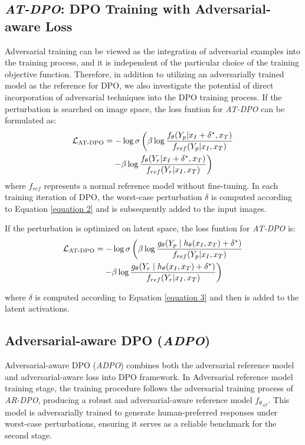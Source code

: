 \vspace{-0.5em}
\subsection{\textit{AT-DPO}: DPO Training with Adversarial-aware Loss}
\vspace{-0.5em}
\label{AT-DPO}
Adversarial training can be viewed as the integration of adversarial examples into the training process, and it is independent of the particular choice of the training objective function. Therefore, in addition to utilizing an adversarially trained model as the reference for DPO, we also investigate the potential of direct incorporation of adversarial techniques into the DPO training process. If the perturbation is searched on image space, the loss funtion for \textit{AT-DPO} can be formulated as:
\vspace{-0.5em}
{\fontsize{10}{12}
\begin{align}
\mathcal{L}_{\text{AT-}\text{DPO}} &= -\log \sigma \left( \beta \log \frac{f_{\theta}(Y_{p} | x_I+\delta^* , x_T)}{f_{ref}(Y_{p} | x_I, x_T)} \right. \notag \\
&\quad \left. - \beta \log \frac{f_{\theta}(Y_{r} | x_I+\delta^* , x_T)}{f_{ref}(Y_{r} | x_I, x_T)} \right)
\end{align}
}
where $f_{ref}$ represents a normal reference model without fine-tuning. In each training iteration of DPO, the worst-case perturbation $\delta$ is computed according to Equation \ref{equation 2} and is subsequently added to the input images. 

If the perturbation is optimized on latent space, the loss funtion for \textit{AT-DPO} is:
\vspace{-0.5em}
{\fontsize{10}{12}
\begin{align} 
\mathcal{L}_{\text{AT-}\text{DPO}} &= -\log \sigma \left( \beta \log \frac{g_\theta(Y_{p} \mid h_{\theta}(x_I, x_T)+ \delta^* )}{f_{ref}(Y_{p} | x_I, x_T)} \right. \notag \\
 &\quad \left. - \beta \log \frac{g_\theta(Y_{r} \mid h_{\theta}(x_I, x_T)+ \delta^* )}{f_{ref}(Y_{r} | x_I, x_T)} \right)
\end{align}
}


where $\delta$ is computed according to Equation \ref{equation 3} and then is added to the latent activations.
\vspace{-0.5em}
\subsection{Adversarial-aware DPO (\textit{ADPO})}
\vspace{-0.5em}
\label{ADPO}
Adversarial-aware DPO (\textit{ADPO}) combines both the adversarial reference model and adversarial-aware loss into DPO framework. In  Adversarial reference model training stage, the training procedure follows the adversarial training process of \textit{AR-DPO}, producing a robust and adversarial-aware reference model $f_{\theta_{AT}}$. This model is adversarially trained to generate human-preferred responses under worst-case perturbations, ensuring it serves as a reliable benchmark for the second stage.

